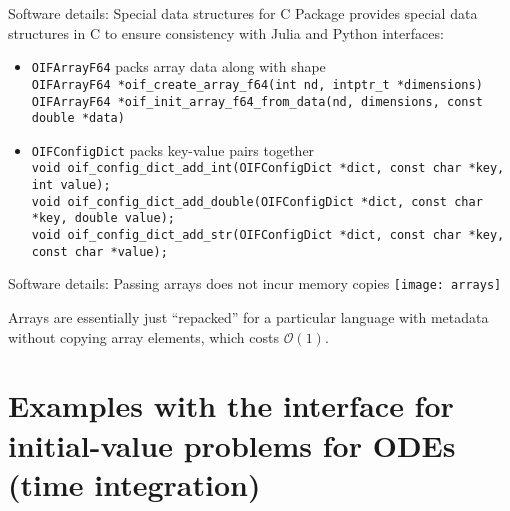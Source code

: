 \documentclass[10pt, aspectratio=169, progressbar=frametitle]{beamer}
\begin{document}
\begin{frame}{Software details: Special data structures for C}
  \small Package provides special data structures in C to ensure consistency
  with Julia and Python interfaces:
  \begin{itemize}
    \item \texttt{OIFArrayF64} packs array data along with shape\\
          \texttt{OIFArrayF64 *oif\_create\_array\_f64(int nd, intptr\_t *dimensions)}\\
          \texttt{OIFArrayF64 *oif\_init\_array\_f64\_from\_data(nd, dimensions, const double *data)
}
      \item<2-> \texttt{OIFConfigDict} packs key-value pairs together\\
          \texttt{void oif\_config\_dict\_add\_int(OIFConfigDict *dict, const char *key, int value);}\\
          \texttt{void oif\_config\_dict\_add\_double(OIFConfigDict *dict, const char *key, double value);}\\
          \texttt{void oif\_config\_dict\_add\_str(OIFConfigDict *dict, const char *key, const char *value);}
  \end{itemize}
\end{frame}

\begin{frame}{Software details: Passing arrays does not incur memory copies}
  \centering
  \texttt{[image: arrays]}

  Arrays are essentially just ``repacked'' for a particular language
  with metadata without copying array elements, which costs $\mathcal O(1)$.
\end{frame}

\section{Examples with the interface for initial-value problems for ODEs (time integration)}
\end{document}
